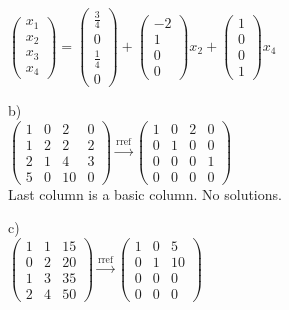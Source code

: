\documentclass[12pt]{article}
\begin{document}
\begin{enumerate}[1.]
$\begin{pmatrix}
x_{1}\\
x_{2}\\
x_{3}\\
x_{4}
\end{pmatrix}
= 
\begin{pmatrix}
\frac{3}{4}\\
0\\
\frac{1}{4}\\
0
\end{pmatrix}
+ 
\begin{pmatrix}
-2\\
1\\
0\\
0
\end{pmatrix}
x_{2}
+ 
\begin{pmatrix}
1\\
0\\
0\\
1
\end{pmatrix}
x_{4}
$

\medskip
b)\\

$\left(
\begin{array}{ccc|c}
1 & 0 & 2  & 0\\
1 & 2 & 2 & 2\\
2 & 1 & 4 & 3\\
5 & 0 & 10 & 0
\end{array}
\right)
\overset{\text{rref}}{\to}
\left(
\begin{array}{ccc|c}
1 & 0 & 2  & 0\\
0 & 1 & 0 & 0\\
0 & 0 & 0 & 1\\
0 & 0 & 0 & 0
\end{array}
\right)
$\\

Last column is a basic column. No solutions.


\medskip
c)\\

$\left(
\begin{array}{cc|c}
1 & 1 & 15 \\
0 & 2 & 20 \\
1 & 3 & 35 \\
2 & 4 & 50
\end{array}
\right)
\overset{\text{rref}}{\to}
\left(
\begin{array}{cc|c}
1 & 0 & 5 \\
0 & 1 & 10 \\
0 & 0 & 0 \\
0 & 0 & 0 
\end{array}
\right)
$\\


\end{enumerate}
\end{document}
